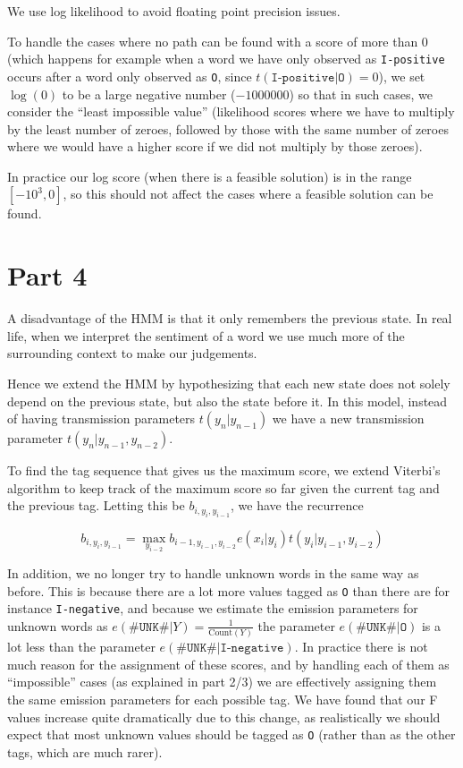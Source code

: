 \documentclass[
]{article}
\begin{document}
We use log likelihood to avoid floating point precision issues.

To handle the cases where no path can be found with a score of more than
0 (which happens for example when a word we have only observed as
\texttt{I-positive} occurs after a word only observed as \texttt{O},
since $t(\texttt{I-positive} | \texttt{O}) = 0$), we set $\log(0)$
to be a large negative number ($-1000000$) so that in such cases,
we consider the ``least impossible value'' (likelihood scores where we
have to multiply by the least number of zeroes, followed by those with
the same number of zeroes where we would have a higher score if we did
not multiply by those zeroes).

In practice our log score (when there is a feasible solution) is in the
range $[-10^3, 0]$, so this should not affect the cases
where a feasible solution can be found.

\hypertarget{part-4}{%
\section{Part 4}\label{part-4}}

A disadvantage of the HMM is that it only remembers the previous state.
In real life, when we interpret the sentiment of a word we use much more
of the surrounding context to make our judgements.

Hence we extend the HMM by hypothesizing that each new state does not
solely depend on the previous state, but also the state before it. In
this model, instead of having transmission parameters
\(t(y_n | y_{n-1})\) we have a new transmission parameter
\(t(y_n | y_{n-1}, y_{n-2})\).

To find the tag sequence that gives us the maximum score, we extend
Viterbi's algorithm to keep track of the maximum score so far given the
current tag and the previous tag. Letting this be
\(b_{i, y_i, y_{i-1}}\), we have the recurrence

\[
b_{i, y_i, y_{i-1}} = \max_{y_{i-2}} b_{i-1, y_{i-1}, y_{i-2}} e(x_i | y_i) t(y_i | y_{i-1}, y_{i-2})
\]

In addition, we no longer try to handle unknown words in the same way as
before. This is because there are a lot more values tagged as \texttt{O}
than there are for instance \texttt{I-negative}, and because we estimate
the emission parameters for unknown words as
$e(\texttt{\#UNK\#} | Y) = \frac{1}{\text{Count}(Y)}$ the parameter
$e(\texttt{\#UNK\#} | \texttt{O})$ is a lot less than the parameter
$e(\texttt{\#UNK\#} | \texttt{I-negative})$. In practice there is not
much reason for the assignment of these scores, and by handling each of
them as ``impossible'' cases (as explained in part 2/3) we are
effectively assigning them the same emission parameters for each
possible tag. We have found that our F values increase quite
dramatically due to this change, as realistically we should expect that
most unknown values should be tagged as \texttt{O} (rather than as the
other tags, which are much rarer).
\end{document}
